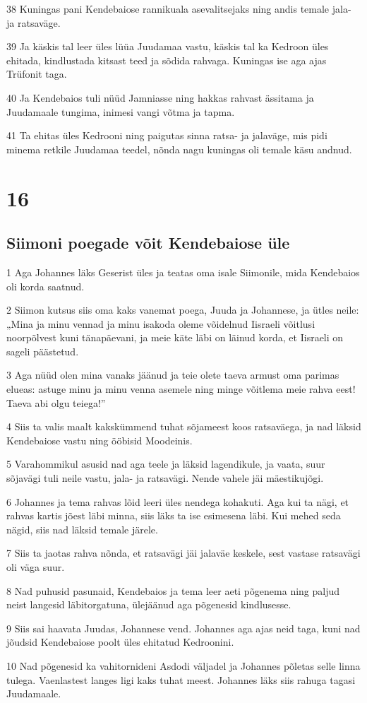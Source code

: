 \par 38 Kuningas pani Kendebaiose rannikuala asevalitsejaks ning andis temale jala- ja ratsaväge.
\par 39 Ja käskis tal leer üles lüüa Juudamaa vastu, käskis tal ka Kedroon üles ehitada, kindlustada kitsast teed ja sõdida rahvaga. Kuningas ise aga ajas Trüfonit taga.
\par 40 Ja Kendebaios tuli nüüd Jamniasse ning hakkas rahvast ässitama ja Juudamaale tungima, inimesi vangi võtma ja tapma.
\par 41 Ta ehitas üles Kedrooni ning paigutas sinna ratsa- ja jalaväge, mis pidi minema retkile Juudamaa teedel, nõnda nagu kuningas oli temale käsu andnud.

\chapter{16}

\section*{Siimoni poegade võit Kendebaiose üle}

\par 1 Aga Johannes läks Geserist üles ja teatas oma isale Siimonile, mida Kendebaios oli korda saatnud.
\par 2 Siimon kutsus siis oma kaks vanemat poega, Juuda ja Johannese, ja ütles neile: „Mina ja minu vennad ja minu isakoda oleme võidelnud Iisraeli võitlusi noorpõlvest kuni tänapäevani, ja meie käte läbi on läinud korda, et Iisraeli on sageli päästetud.
\par 3 Aga nüüd olen mina vanaks jäänud ja teie olete taeva armust oma parimas elueas: astuge minu ja minu venna asemele ning minge võitlema meie rahva eest! Taeva abi olgu teiega!”
\par 4 Siis ta valis maalt kakskümmend tuhat sõjameest koos ratsaväega, ja nad läksid Kendebaiose vastu ning ööbisid Moodeinis.
\par 5 Varahommikul asusid nad aga teele ja läksid lagendikule, ja vaata, suur sõjavägi tuli neile vastu, jala- ja ratsavägi. Nende vahele jäi mäestikujõgi.
\par 6 Johannes ja tema rahvas lõid leeri üles nendega kohakuti. Aga kui ta nägi, et rahvas kartis jõest läbi minna, siis läks ta ise esimesena läbi. Kui mehed seda nägid, siis nad läksid temale järele.
\par 7 Siis ta jaotas rahva nõnda, et ratsavägi jäi jalaväe keskele, sest vastase ratsavägi oli väga suur.
\par 8 Nad puhusid pasunaid, Kendebaios ja tema leer aeti põgenema ning paljud neist langesid läbitorgatuna, ülejäänud aga põgenesid kindlusesse.
\par 9 Siis sai haavata Juudas, Johannese vend. Johannes aga ajas neid taga, kuni nad jõudsid Kendebaiose poolt üles ehitatud Kedroonini.
\par 10 Nad põgenesid ka vahitornideni Asdodi väljadel ja Johannes põletas selle linna tulega. Vaenlastest langes ligi kaks tuhat meest. Johannes läks siis rahuga tagasi Juudamaale. 

